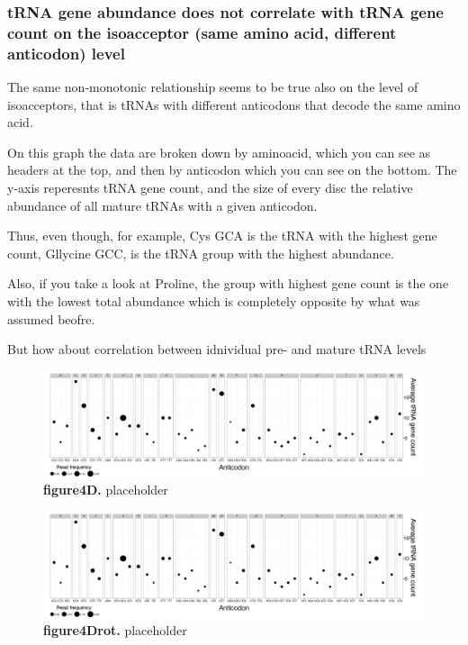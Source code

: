 \documentclass[12pt]{rockefeller}
\begin{document}
\subsubsection{tRNA gene abundance does not correlate with tRNA gene count on the isoacceptor (same amino acid, different anticodon) level}
The same non-monotonic relationship seems to be true also on the level of isoacceptors, that is tRNAs with different anticodons that decode the same amino acid. 

On this graph the data are broken down by aminoacid, which you can see as headers at the top, and then by anticodon which you can see on the bottom. The y-axis reperesnts tRNA gene count, and the size of every disc the relative abundance of all mature tRNAs with a given anticodon. 

Thus, even though, for example, Cys GCA is the tRNA with the highest gene count, Gllycine GCC, is the tRNA group with the highest abundance. 

Also, if you take a look at Proline, the group with highest gene count is the one with the lowest total abundance which is completely opposite by what was assumed beofre. 

But how about correlation between idnividual pre- and mature tRNA levels 

\begin{figure}[!ht]%
\centering
\includegraphics[width=\textwidth]{paper4D.png}%
\caption[figure4D]
{\textbf{figure4D.}
placeholder}
\centering
\label{paper4}%
\end{figure}

\begin{figure}[!ht]%
\centering
\includegraphics[width=\textwidth, angle=90]{paper4Drot.png}%
\caption[figure4Drot]
{\textbf{figure4Drot.}
placeholder}
\centering
\label{paper4Drot}%
\end{figure}	
\end{document}
